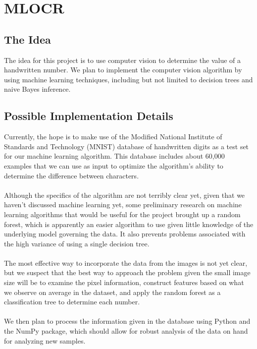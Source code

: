 \documentclass{article}
\theoremstyle{definition}
\theoremstyle{remark}
\begin{document}
	 \section*{MLOCR}
	\label*{Optical Character Recognition using Machine Learning}
	   \subsection*{The Idea}
     The idea for this project is to use computer vision to determine the value of a handwritten number. We plan to implement the computer vision algorithm by using machine learning techniques, including but not limited to decision trees and naive Bayes inference.
     \subsection*{Possible Implementation Details}
     Currently, the hope is to make use of the Modified National Institute of Standards and Technology (MNIST) database of handwritten digits as a test set for our machine learning algorithm. This database includes about 60,000 examples that we can use as input to optimize the algorithm's ability to determine the difference between characters. \\\\
     Although the specifics of the algorithm are not terribly clear yet, given that we haven't discussed machine learning yet, some preliminary research on machine learning algorithms that would be useful for the project brought up a random forest, which is apparently an easier algorithm to use given little knowledge of the underlying model governing the data. It also prevents problems associated with the high variance of using a single decision tree. \\\\
     The most effective way to incorporate the data from the images is not yet clear, but we suspect that the best way to approach the problem given the small image size will be to examine the pixel information, construct features based on what we observe on average in the dataset, and apply the random forest as a classification tree to determine each number.\\\\
     We then plan to process the information given in the database using Python and the NumPy package, which should allow for robust analysis of the data on hand for analyzing new samples.

    
\end{document}
